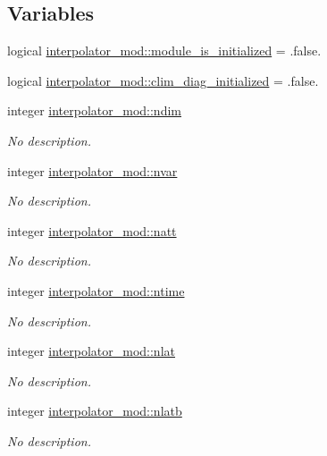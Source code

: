 \subsection*{Variables}
\begin{DoxyCompactItemize}
\item 
logical \hyperlink{namespaceinterpolator__mod_ae7d4ce9b2f2c2bad62b1b5ccc42c47d4}{interpolator\+\_\+mod\+::module\+\_\+is\+\_\+initialized} = .false.
\item 
logical \hyperlink{namespaceinterpolator__mod_a7c2831b23ac995cf169be6a48e68d922}{interpolator\+\_\+mod\+::clim\+\_\+diag\+\_\+initialized} = .false.
\item 
integer \hyperlink{namespaceinterpolator__mod_afe7363e978db4f43d2ec875782d11905}{interpolator\+\_\+mod\+::ndim}
\begin{DoxyCompactList}\small\item\em No description. \end{DoxyCompactList}\item 
integer \hyperlink{namespaceinterpolator__mod_a8b6676021f1433389722a1e58874ef24}{interpolator\+\_\+mod\+::nvar}
\begin{DoxyCompactList}\small\item\em No description. \end{DoxyCompactList}\item 
integer \hyperlink{namespaceinterpolator__mod_aacd4aa63767bc26edefcb04c29f8028a}{interpolator\+\_\+mod\+::natt}
\begin{DoxyCompactList}\small\item\em No description. \end{DoxyCompactList}\item 
integer \hyperlink{namespaceinterpolator__mod_a198173eacff0dac724ca6685559cc5d0}{interpolator\+\_\+mod\+::ntime}
\begin{DoxyCompactList}\small\item\em No description. \end{DoxyCompactList}\item 
integer \hyperlink{namespaceinterpolator__mod_abcdb088fcb76bc41c4e1f580647333ba}{interpolator\+\_\+mod\+::nlat}
\begin{DoxyCompactList}\small\item\em No description. \end{DoxyCompactList}\item 
integer \hyperlink{namespaceinterpolator__mod_ac9300e7ba21e0be5f73bc6e3b8b8b088}{interpolator\+\_\+mod\+::nlatb}
\begin{DoxyCompactList}\small\item\em No description. \end{DoxyCompactList}\item 

\end{DoxyCompactItemize}
